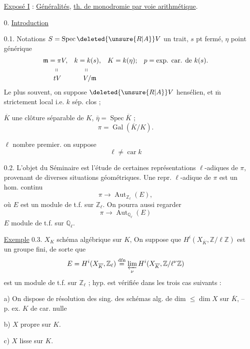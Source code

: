 \uline{Exposé I}\quad {} : \uline{Généralités},  \uline{th. de monodromie par voie arithmétique}.

0. \uline{Introduction}

0.1. Notations \(S=\operatorname{Spec}\deleted{\unsure{R|A}}V\) un trait, \(s\) pt fermé, \(\eta\) point générique
\[
\begin{aligned}
\mathfrak m&=\pi V, & k&=k(s), & K&=k(\eta); & p&=\text{exp. car. de }k(s).\\[-2pt]
&\phantom{=}\shortparallel &&\phantom{=}\shortparallel\\[-2pt]
&\phantom{=}tV &&\phantom{=}V/\mathfrak m
\end{aligned}
\]
Le plus souvent, on suppose \(\deleted{\unsure{R|A}}V\) hensélien, et \(\overline{\mathrm m}\) strictement local i.e. \(k\) sép. clos ;

 \(\overline K\) une clôture séparable de \(K\), \(\bar\eta=\operatorname{Spec}\overline K\) ;
\[
\pi=\operatorname{Gal}(\overline K/K).
\]

\(\ell\) nombre premier.     on suppose 
\[
\ell\ne\operatorname{car}k
\]

0.2. L'objet du Séminaire est l'étude de certaines représentations \(\ell\)-adiques de \(\pi\), provenant de diverses situations géométriques. Une repr. \(\ell\)-adique de \(\pi\) est un  hom. continu
\[
\pi\longrightarrow\operatorname{Aut}_{\mathbb Z_\ell}(E),\tag*{(*)}
\]
où \(E\) est un module de t.f. sur \(\mathbb Z_\ell\). On pourra aussi regarder
\[
\pi\longrightarrow\operatorname{Aut}_{\mathbb Q_\ell}(E)
\]
\(E\) module de t.f. sur \(\mathbb Q_\ell\).

\uline{Exemple} 0.3. \(X_K\) schéma algébrique sur \(K\),  On suppose que \(H^i(X_{\overline K},\mathbb Z/\ell\mathbb Z)\) est un groupe fini, de sorte que
\[
E=H^i(X_{\overline K},\mathbb Z_\ell)\overset{\mathrm{dfn}}{=}\varprojlim_{\nu}H^i(X_{\overline K},\mathbb Z/\ell^{\nu}\mathbb Z)
\]
est un module de t.f. sur \(\mathbb Z_\ell\) ;  hyp.  est  vérifiée dans les trois cas suivants :

a) On dispose de résolution des sing.  des schémas alg. de dim \(\leq\dim X\) sur \(\overline K\), -- p. ex. \(K\) de car. nulle

b) \(X\) propre sur \(K\).

c) \(X\) lisse sur \(K\).
